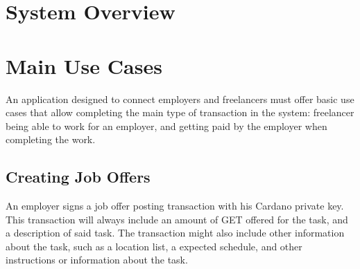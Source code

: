 \documentclass{article}
\begin{document}
\section{System Overview}

\newpage

 
\section{Main Use Cases}
An application designed to connect employers and freelancers must offer basic use cases that allow completing the main type of transaction in the system: freelancer being able to work for an employer, and getting paid by the employer when completing the work.

\subsection{Creating Job Offers}
An employer signs a job offer posting transaction with his Cardano private key. This transaction will always include an amount of GET offered for the task, and a description of said task. The transaction might also include other information about the task, such as a location list, a expected schedule, and other instructions or information about the task.
\end{document}
